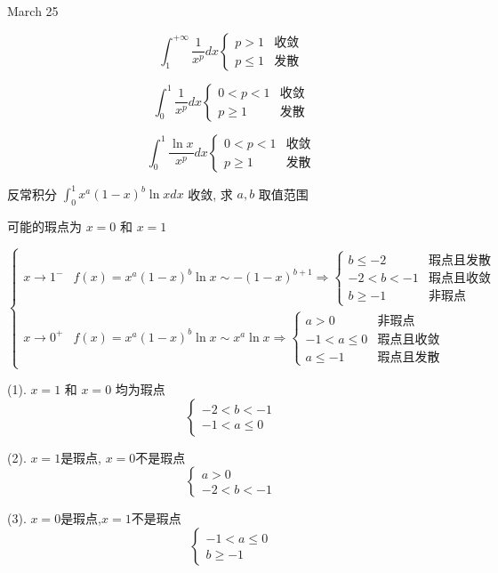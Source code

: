 \textcolor{purplea}{March 25}

\begin{lemma}[特殊反常积分]
	
	$$\int_{1}^{+\infty}\dfrac{1}{x^p}dx 
	\begin{cases}
		p > 1 & \text{收敛}\\
		p\leq 1 & \text{发散}
	\end{cases}$$

	$$\int_{0}^{1}\dfrac{1}{x^p}dx
	\begin{cases}
		0 < p < 1 & \text{收敛}\\
		p\geq 1  & \text{发散}
	\end{cases}$$

	$$\int_{0}^{1}\dfrac{\ln x}{x^p}dx
	\begin{cases}
		0 < p < 1 & \text{收敛}\\
		p\geq 1 & \text{发散}
	\end{cases}$$
\end{lemma}
\begin{example}[][Exam: 29.4.7]
	反常积分 $\int_{0}^{1}x^{a}(1-x)^{b}\ln xdx$ 收敛, 求 $a,b$ 取值范围
\end{example}

\begin{solution}
	
	可能的瑕点为 $x=0$ 和  $x=1$

	$$\begin{cases}
	  x\to 1^{-} & f(x) = x^{a}(1-x)^{b}\ln x \sim -(1-x)^{b+1}\Rightarrow 
	  \begin{cases}
		b\leq -2 & \text{瑕点且发散}\\
		-2 < b < -1 & \text{瑕点且收敛}\\
		b \geq -1 & \text{非瑕点}	
	  \end{cases} \\
	  x\to 0^{+} & f(x) = x^{a}(1-x)^{b}\ln x \sim x^{a}\ln x\Rightarrow
	  \begin{cases}
		a > 0 & \text{非瑕点}\\
		-1 < a \leq 0 & \text{瑕点且收敛}\\
		a \leq -1 & \text{瑕点且发散}
	  \end{cases}
	\end{cases}$$
	
	(1). $x=1$ 和 $x=0$ 均为瑕点 
	$$\begin{cases}
		-2 < b < -1\\
		-1 < a \leq 0
	\end{cases}$$
	
	(2). $x=1$是瑕点, $x=0$不是瑕点 
	$$\begin{cases}
		a > 0\\
		-2 < b < -1
	\end{cases}$$
	
	(3). $x=0$是瑕点,$x=1$不是瑕点
	$$\begin{cases}
		-1 < a \leq 0\\
		b \geq -1
	\end{cases}$$
\end{solution}

